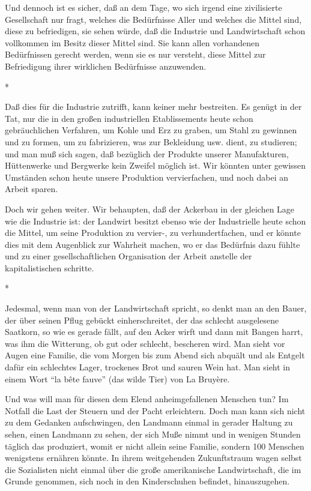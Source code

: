 \documentclass{scrbook}
\begin{document}
Und dennoch ist es sicher, daß an dem Tage, wo sich irgend eine zivilisierte Gesellschaft nur fragt, welches die Bedürfnisse Aller und welches die Mittel sind, diese zu befriedigen, sie sehen würde, daß die Industrie und Landwirtschaft schon vollkommen im Besitz dieser Mittel sind. Sie kann allen vorhandenen Bedürfnissen gerecht werden, wenn sie es nur versteht, diese Mittel zur Befriedigung ihrer wirklichen Bedürfnisse anzuwenden.

\begin{center}*\end{center}

Daß dies für die Industrie zutrifft, kann keiner mehr bestreiten. Es genügt in der Tat, nur die in den großen industriellen Etablissements heute schon gebräuchlichen Verfahren, um Kohle und Erz zu graben, um Stahl zu gewinnen und zu formen, um zu fabrizieren, was zur Bekleidung usw. dient, zu studieren; und man muß sich sagen, daß bezüglich der Produkte unserer Manufakturen, Hüttenwerke und Bergwerke kein Zweifel möglich ist. Wir könnten unter gewissen Umständen schon heute unsere Produktion vervierfachen, und noch dabei an Arbeit sparen.

Doch wir gehen weiter. Wir behaupten, daß der Ackerbau in der gleichen Lage wie die Industrie ist: der Landwirt besitzt ebenso wie der Industrielle heute schon die Mittel, um seine Produktion zu vervier-, zu verhundertfachen, und er könnte dies mit dem Augenblick zur Wahrheit machen, wo er das Bedürfnis dazu fühlte und zu einer gesellschaftlichen Organisation der Arbeit anstelle der kapitalistischen schritte.

\begin{center}*\end{center}

Jedesmal, wenn man von der Landwirtschaft spricht, so denkt man an den Bauer, der über seinen Pflug gebückt einherschreitet, der das schlecht ausgelesene Saatkorn, so wie es gerade fällt, auf den Acker wirft und dann mit Bangen harrt, was ihm die Witterung, ob gut oder schlecht, bescheren wird. Man sieht vor Augen eine Familie, die vom Morgen bis zum Abend sich abquält und als Entgelt dafür ein schlechtes Lager, trockenes Brot und sauren Wein hat. Man sieht in einem Wort ``la bête fauve'' (das wilde Tier) von La Bruyère.

Und was will man für diesen dem Elend anheimgefallenen Menschen tun? Im Notfall die Last der Steuern und der Pacht erleichtern. Doch man kann sich nicht zu dem Gedanken aufschwingen, den Landmann einmal in gerader Haltung zu sehen, einen Landmann zu sehen, der sich Muße nimmt und in wenigen Stunden täglich das produziert, womit er nicht allein seine Familie, sondern 100 Menschen wenigstens ernähren könnte. In ihrem weitgehenden Zukunftstraum wagen selbst die Sozialisten nicht einmal über die große amerikanische Landwirtschaft, die im Grunde genommen, sich noch in den Kinderschuhen befindet, hinauszugehen.
\end{document}
